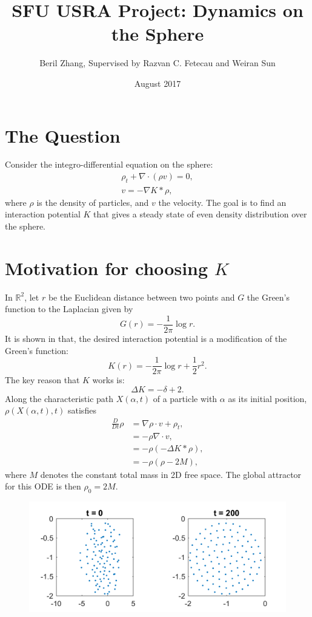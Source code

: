 \documentclass{article}
\title{SFU USRA Project: Dynamics on the Sphere} %
\date{August 2017}
\author{Beril Zhang, Supervised by Razvan C. Fetecau and Weiran Sun} %
\newcommand{\eq}[1]{\begin{align}#1\end{align}}
\begin{document}
\maketitle
\section{The Question}

Consider the integro-differential equation on the sphere:
\eq{
\rho_t + \nabla \cdot (\rho v) =  0, \\
v = -\nabla K * \rho, \label{velocity}
}
where $\rho$ is the density of particles, and $v$ the velocity. The goal is to find an interaction potential $K$ that gives a steady state of even density distribution over the sphere.

\section{Motivation for choosing $K$}
In $\mathbb{R}^2$, let $r$ be the Euclidean distance between two points and $G$ the Green's function to the Laplacian given by
\[
G(r) = -\frac{1}{2\pi} \log{r}.
\]
It is shown in \cite{swarm} that, the desired interaction potential is a modification of the Green's function:
\[
K(r) = -\frac{1}{2\pi} \log{ r } + \frac{1}{2}  r^2.\]
The key reason that $K$ works is:
\begin{equation}
\label{R2Laplacian}
\Delta K = -\delta + 2.
\end{equation}
Along the characteristic path $X(\alpha,t)$ of a particle with $\alpha$ as its initial position, $\rho(X(\alpha,t),t)$ satisfies
\begin{align}
\frac{D}{Dt} \rho &= \nabla \rho \cdot v + \rho_t, \\
&= -\rho \nabla \cdot v, \\
&=-\rho (-\Delta K * \rho),\label{approach}\\
&=-\rho (\rho - 2M),
\end{align}
where $M$ denotes the constant total mass in 2D free space. The global attractor for this ODE is then $\rho_0=2M$.

\begin{figure}
\centering
\includegraphics[width=\linewidth]{dim2.png}
\end{figure}
\end{document}
